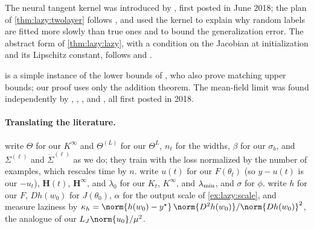 \begin{refsection}
\begin{exercises}
\end{exercises}

\notesandrefs
The neural tangent kernel was introduced by \textcite{JacotEtAl2018}, first posted in June 2018; the plan of \cref{thm:lazy:twolayer} follows \textcite{DuEtAl2019}, and \textcite{AroraEtAl2019b} used the kernel to explain why random labels are fitted more slowly than true ones and to bound the generalization error. The abstract form of \cref{thm:lazy:lazy}, with a condition on the Jacobian at initialization and its Lipschitz constant, follows \textcite{OymakSoltanolkotabi2020} and \textcite{ChizatEtAl2019}.

 is a simple instance of the lower bounds of \textcite{GhorbaniEtAl2021}, who also prove matching upper bounds; our proof uses only the addition theorem. The mean-field limit was found independently by \textcite{MeiEtAl2018}, \textcite{ChizatBach2018}, \textcite{RotskoffVandenEijnden2022}, and \textcite{SirignanoSpiliopoulos2020}, all first posted in 2018.

\paragraph{Translating the literature.} \Textcite{JacotEtAl2018} write $\Theta$ for our $K^\infty$ and $\Theta^{(L)}$ for our $\Theta^L$, $n_\ell$ for the widths, $\beta$ for our $\sigma_b$, and $\Sigma^{(\ell)}$ and $\dot\Sigma^{(\ell)}$ as we do; they train with the loss normalized by the number of examples, which rescales time by $n$. \Textcite{DuEtAl2019} write $u(t)$ for our $F(\theta_t)$ (so $y-u(t)$ is our $-u_t$), $\mathbf H(t)$, $\mathbf H^\infty$, and $\lambda_0$ for our $K_t$, $K^\infty$, and $\lambda_{\min}$, and $\sigma$ for $\phi$. \Textcite{ChizatEtAl2019} write $h$ for our $F$, $Dh(w_0)$ for $J(\theta_0)$, $\alpha$ for the output scale of \cref{ex:lazy:scale}, and measure laziness by $\kappa_h=\norm{h(w_0)-y^\star}\,\norm{D^2h(w_0)}/\norm{Dh(w_0)}^2$, the analogue of our $L_J\norm{u_0}/\mu^2$.

\printchapterbib
\end{refsection}
